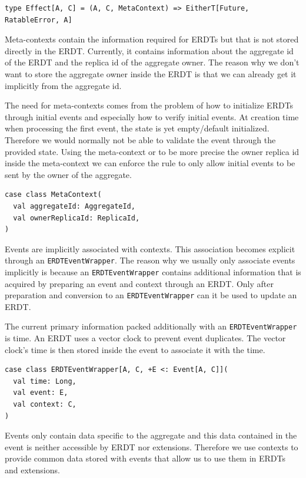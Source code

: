 \documentclass[
	english,
	ruledheaders=section,   %
	class=report,		    %
	thesis={type=bachelor}, %
	accentcolor=9c,			%
	custommargins=true,    %
	marginpar=false,        %
	parskip=half-,          %
	fontsize=11pt,          %
]{tudapub}
\begin{document}
\begin{lstlisting}
type Effect[A, C] = (A, C, MetaContext) => EitherT[Future, RatableError, A]
\end{lstlisting}

Meta-contexts contain the information required for ERDTs but that is not stored directly in the ERDT. Currently, it contains information about the aggregate id of the ERDT and the replica id of the aggregate owner. The reason why we don't want to store the aggregate owner inside the ERDT is that we can already get it implicitly from the aggregate id.

The need for meta-contexts comes from the problem of how to initialize ERDTs through initial events and especially how to verify initial events. At creation time when processing the first event, the state is yet empty/default initialized. Therefore we would normally not be able to validate the event through the provided state. Using the meta-context or to be more precise the owner replica id inside the meta-context we can enforce the rule to only allow initial events to be sent by the owner of the aggregate.

\begin{lstlisting}
case class MetaContext(
  val aggregateId: AggregateId,
  val ownerReplicaId: ReplicaId,
)
\end{lstlisting}

Events are implicitly associated with contexts. This association becomes explicit through an \texttt{ERDTEventWrapper}. The reason why we usually only associate events implicitly is because an \texttt{ERDTEventWrapper} contains additional information that is acquired by preparing an event and context through an ERDT. Only after preparation and conversion to an \texttt{ERDTEventWrapper} can it be used to update an ERDT. 

The current primary information packed additionally with an \texttt{ERDTEventWrapper} is time. An ERDT uses a vector clock to prevent event duplicates. The vector clock's time is then stored inside the event to associate it with the time.

\begin{lstlisting}
case class ERDTEventWrapper[A, C, +E <: Event[A, C]](
  val time: Long,
  val event: E,
  val context: C,
)
\end{lstlisting}

 \label{sec:context}
Events only contain data specific to the aggregate and this data contained in the event is neither accessible by ERDT nor extensions. Therefore we use contexts to provide common data stored with events that allow us to use them in ERDTs and extensions. 
\end{document}
